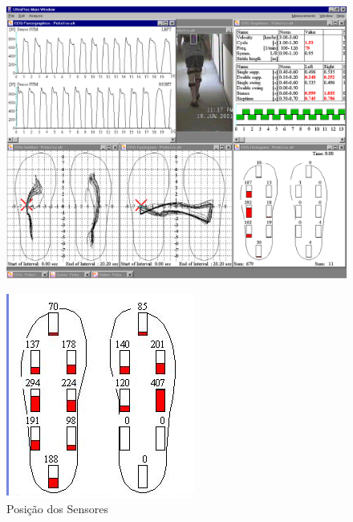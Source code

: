 \begin{figure}[!htbp]
 \centering
 \includegraphics[scale=0.4]{./img/ultraflexdinografia.png}
\caption{}
 \label{fig:dynography}
\end{figure}

\begin{figure}[!htbp]
 \centering
 \includegraphics[scale=0.7]{./img/ultraflexposition.png}
\caption{Posição dos Sensores}
 \label{fig:posicaosensores}
\end{figure}

